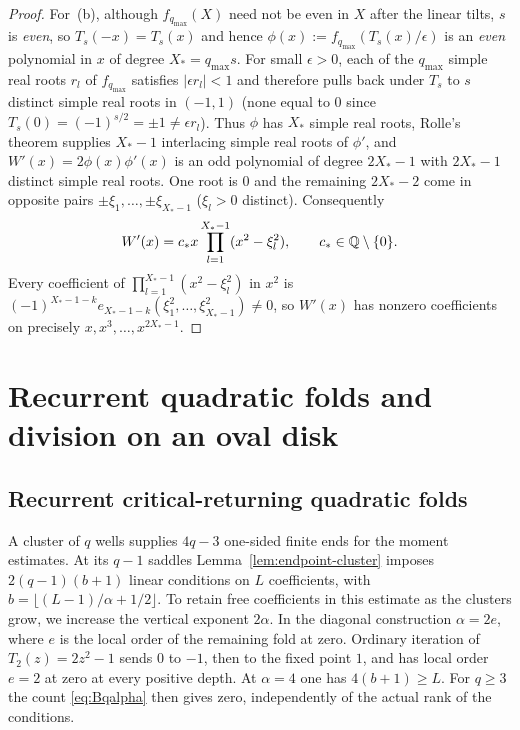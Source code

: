 \begin{proof}
For~(b), although $f_{q_{\max}}(X)$ need not be even in $X$ after the linear tilts, $s$ is \emph{even}, so $T_s(-x)=T_s(x)$ and hence $\phi(x):=f_{q_{\max}}(T_s(x)/\epsilon)$ is an \emph{even} polynomial in $x$ of degree $X_*=q_{\max} s$. For small $\epsilon>0$, each of the $q_{\max}$ simple real roots $r_l$ of $f_{q_{\max}}$ satisfies $|\epsilon r_l|<1$ and therefore pulls back under $T_s$ to $s$ distinct simple real roots in $(-1,1)$ (none equal to $0$ since $T_s(0)=(-1)^{s/2}=\pm 1\ne\epsilon r_l$). Thus $\phi$ has $X_*$ simple real roots, Rolle's theorem supplies $X_*-1$ interlacing simple real roots of $\phi'$, and $W'(x)=2\phi(x)\phi'(x)$ is an odd polynomial of degree $2X_*-1$ with $2X_*-1$ distinct simple real roots. One root is $0$ and the remaining $2X_*-2$ come in opposite pairs $\pm\xi_1,\dots,\pm\xi_{X_*-1}$ ($\xi_l>0$ distinct). Consequently
\[
  W'(x) = c_* x \prod_{l=1}^{X_*-1} (x^2-\xi_l^2), \qquad c_*\in\mathbb{Q}\setminus\{0\}.
\]
Every coefficient of $\prod_{l=1}^{X_*-1}(x^2-\xi_l^2)$ in $x^2$ is $(-1)^{X_*-1-k} e_{X_*-1-k}(\xi_1^2,\dots,\xi_{X_*-1}^2)\ne 0$, so $W'(x)$ has nonzero coefficients on precisely $x,x^3,\dots,x^{2X_*-1}$.
\end{proof}

\section{Recurrent quadratic folds and division on an oval disk}\label{sec:folds}

\subsection{Recurrent critical-returning quadratic folds}

A cluster of \(q\) wells supplies \(4q-3\) one-sided finite ends for the moment estimates. At its \(q-1\) saddles Lemma~\ref{lem:endpoint-cluster} imposes \(2(q-1)(b+1)\) linear conditions on \(L\) coefficients, with \(b=\lfloor(L-1)/\alpha+1/2\rfloor\). To retain free coefficients in this estimate as the clusters grow, we increase the vertical exponent \(2\alpha\). In the diagonal construction \(\alpha=2e\), where \(e\) is the local order of the remaining fold at zero. Ordinary iteration of \(T_2(z)=2z^2-1\) sends \(0\) to \(-1\), then to the fixed point \(1\), and has local order \(e=2\) at zero at every positive depth. At \(\alpha=4\) one has \(4(b+1)\ge L\). For \(q\ge3\) the count \eqref{eq:Bqalpha} then gives zero, independently of the actual rank of the conditions.

